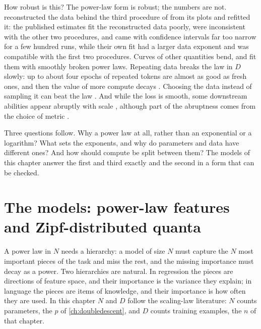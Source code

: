 \begin{refsection}
How robust is this? The power-law form is robust; the numbers are not. \Textcite{BesirogluEtAl2024} reconstructed the data behind the third procedure of \textcite{HoffmannEtAl2022} from its plots and refitted it: the published estimates fit the reconstructed data poorly, were inconsistent with the other two procedures, and came with confidence intervals far too narrow for a few hundred runs, while their own fit had a larger data exponent and was compatible with the first two procedures. Curves of other quantities bend, and \textcite{CaballeroEtAl2023} fit them with smoothly broken power laws. Repeating data breaks the law in $D$ slowly: up to about four epochs of repeated tokens are almost as good as fresh ones, and then the value of more compute decays \parencite{MuennighoffEtAl2023}. Choosing the data instead of sampling it can beat the law \parencite{SorscherEtAl2022}. And while the loss is smooth, some downstream abilities appear abruptly with scale \parencite{WeiEtAl2022}, although part of the abruptness comes from the choice of metric \parencite{SchaefferEtAl2023}.

Three questions follow. Why a power law at all, rather than an exponential or a logarithm? What sets the exponents, and why do parameters and data have different ones? And how should compute be split between them? The models of this chapter answer the first and third exactly and the second in a form that can be checked.

\section{The models: power-law features and Zipf-distributed quanta}\label{sec:scaling:model}

A power law in $N$ needs a hierarchy: a model of size $N$ must capture the $N$ most important pieces of the task and miss the rest, and the missing importance must decay as a power. Two hierarchies are natural. In regression the pieces are directions of feature space, and their importance is the variance they explain; in language the pieces are items of knowledge, and their importance is how often they are used. In this chapter $N$ and $D$ follow the scaling-law literature: $N$ counts parameters, the $p$ of \cref{ch:doubledescent}, and $D$ counts training examples, the $n$ of that chapter.



\end{refsection}
